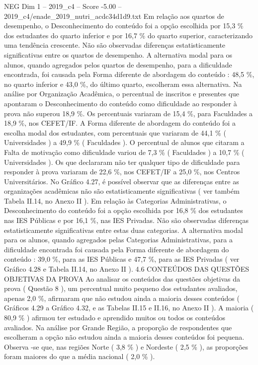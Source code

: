 \begin{textsample}{NEG Dim 1 – 2019\_c4 – Score -5.00 – 2019\_c4/enade\_2019\_nutri\_acdc34d1d9.txt}
Em relação aos quartos de desempenho, o Desconhecimento do conteúdo foi a opção escolhida por 15,3 \% dos estudantes do quarto inferior e por 16,7 \% do quarto superior, caracterizando uma tendência crescente.
Não são observadas diferenças estatisticamente significativas entre os quartos de desempenho.
A alternativa modal para os alunos, quando agregados pelos quartos de desempenho, para a dificuldade encontrada, foi causada pela Forma diferente de abordagem do conteúdo : 48,5 \%, no quarto inferior e 43,0 \%, do último quarto, escolheram essa alternativa.
Na análise por Organização Acadêmica, o percentual de inscritos e presentes que apontaram o Desconhecimento do conteúdo como dificuldade ao responder à prova não superou 18,9 \%.
Os percentuais variaram de 15,4 \%, para Faculdades a 18,9 \%, nos CEFET/IF.
A Forma diferente de abordagem do conteúdo foi a escolha modal dos estudantes, com percentuais que variaram de 44,1 \% ( Universidades ) a 49,9 \% ( Faculdades ).
O percentual de alunos que citaram a Falta de motivação como dificuldade variou de 7,3 \% ( Faculdades ) a 10,7 \% ( Universidades ).
Os que declararam não ter qualquer tipo de dificuldade para responder à prova variaram de 22,6 \%, nos CEFET/IF a 25,0 \%, nos Centros Universitários.
No Gráfico 4.27, é possível observar que as diferenças entre as organizações acadêmicas não são estatisticamente significativas ( ver também Tabela II.14, no Anexo II ).
Em relação às Categorias Administrativas, o Desconhecimento do conteúdo foi a opção escolhida por 16,8 \% dos estudantes nas IES Públicas e por 16,1 \%, nas IES Privadas.
Não são observadas diferenças estatisticamente significativas entre estas duas categorias.
A alternativa modal para os alunos, quando agregados pelas Categorias Administrativas, para a dificuldade encontrada foi causada pela Forma diferente de abordagem do conteúdo : 39,0 \%, para as IES Públicas e 47,7 \%, para as IES Privadas ( ver Gráfico 4.28 e Tabela II.14, no Anexo II ). 4.6 CONTEÚDOS DAS QUESTÕES OBJETIVAS DA PROVA Ao analisar os conteúdos das questões objetivas da prova ( Questão 8 ), um percentual muito pequeno dos estudantes avaliados, apenas 2,0 \%, afirmaram que não estudou ainda a maioria desses conteúdos ( Gráficos 4.29 a Gráfico 4.32, e as Tabelas II.15 e II.16, no Anexo II ).
A maioria ( 80,9 \% ) afirmou ter estudado e aprendido muitos ou todos os conteúdos avaliados.
Na análise por Grande Região, a proporção de respondentes que escolheram a opção não estudou ainda a maioria desses conteúdos foi pequena.
Observa -se que, nas regiões Norte ( 3,8 \% ) e Nordeste ( 2,5 \% ), as proporções foram maiores do que a média nacional ( 2,0 \% ).

\end{textsample}
